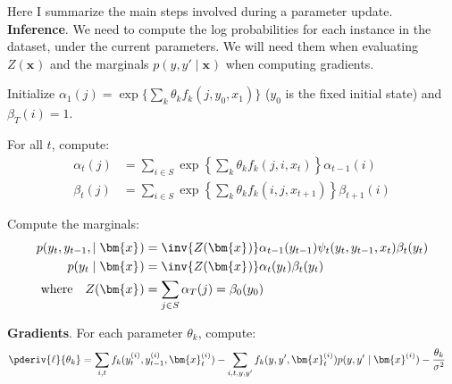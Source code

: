 \documentclass[11pt]{article}
\renewcommand\vec[2][]{\bm{#2}_{#1}}
\begin{document}
\begin{algorithm}
	Here I summarize the main steps involved during a parameter update.\\

	\textbf{Inference}. We need to compute the log probabilities for each instance in the dataset, under the current parameters. We will need them when evaluating $Z(\vec x)$ and the marginals $p(y, y' \mid \vec x)$ when computing gradients.
	\begin{compactenum}
		\item Initialize $\alpha_1(j) = \exp\{ \sum_k \theta_k f_k(j, y_0, x_1) \}$ ($y_0$ is the fixed initial state) and $\beta_T(i) = 1$. 
		
		\item For all $t$, compute:
		\begin{align}
		\alpha_t(j) &= \sum_{i \in S} \exp\left\{ \sum_k \theta_k f_k(j, i, x_t)\right\}  \alpha_{t - 1}(i)  \\
		\beta_t(j) &= \sum_{i \in S}   \exp\left\{ \sum_k \theta_k f_k(i, j, x_{t+1})\right\} \beta_{t+1}(i)
		\end{align}
		
		\item Compute the marginals:
		\begin{align}
		p(y_t, y_{t-1}, \mid \vec{x}) &=
		\inv{Z(\vec x)} \alpha_{t -1}(y_{t-1}) \psi_t(y_t, y_{t-1}, x_t) \beta_t(y_t)	\\
		p(y_t \mid \vec x) &= \inv{Z(\vec x)} \alpha_t(y_t) \beta_t(y_t) \\
		\text{where}\quad 
		Z(\vec x) &=  \sum_{j \in S} \alpha_T(j)  =  \beta_0(y_0) 
		\end{align}
	\end{compactenum}
	
	\textbf{Gradients}. For each parameter $\theta_k$, compute:
	\begin{align}
	\pderiv{\ell}{\theta_k} &= \sum_{i,t} f_k(y_t^{(i)}, y_{t-1}^{(i)}, \vec[t]{x}^{(i)})
	- \sum_{i,t,y,y'} f_k(y, y', \vec[t]{x}^{(i)}) p(y, y' \mid \vec{x}^{(i)})
	- \frac{\theta_k}{\sigma^2}
	\end{align}
\end{algorithm}
\end{document}
